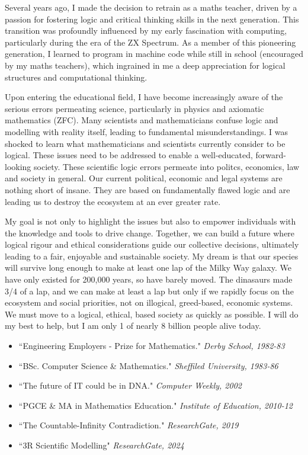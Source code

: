 \documentclass[12pt]{article}
\begin{document}
Several years ago, I made the decision to retrain as a maths teacher, driven by a passion for fostering logic and critical thinking skills in the next generation. This transition was profoundly influenced by my early fascination with computing, particularly during the era of the ZX Spectrum. As a member of this pioneering generation, I learned to program in machine code while still in school (encouraged by my maths teachers), which ingrained in me a deep appreciation for logical structures and computational thinking.

Upon entering the educational field, I have become increasingly aware of the serious errors permeating science, particularly in physics and axiomatic mathematics (ZFC). Many scientists and mathematicians confuse logic and modelling with reality itself, leading to fundamental misunderstandings. I was shocked to learn what mathematicians and scientists currently consider to be logical. These issues need to be addressed to enable a well-educated, forward-looking society. These scientific logic errors permeate into politcs, economics, law and society in general. Our current political, economic and legal systems are nothing short of insane. They are based on fundamentally flawed logic and are leading us to destroy the ecosystem at an ever greater rate.

My goal is not only to highlight the issues but also to empower individuals with the knowledge and tools to drive change. Together, we can build a future where logical rigour and ethical considerations guide our collective decisions, ultimately leading to a fair, enjoyable and sustainable society. My dream is that our species will survive long enough to make at least one lap of the Milky Way galaxy. We have only existed for 200,000 years, so have barely moved. The dinasaurs made 3/4 of a lap, and we can make at least a lap but only if we rapidly focus on the ecosystem and social priorities, not on illogical, greed-based, economic systems. We must move to a logical, ethical, \iR{} based society as quickly as possible. I will do my best to help, but I am only 1 of nearly 8 billion people alive today.
\begin{itemize}
    \item ``Engineering Employers - Prize for Mathematics." \textit{Derby School, 1982-83}
    \item ``BSc. Computer Science \& Mathematics." \textit{Sheffiled University, 1983-86}
    \item ``The future of IT could be in DNA." \textit{Computer Weekly, 2002}
    \item ``PGCE \& MA in Mathematics Education." \textit{Institute of Education, 2010-12}
    \item ``The Countable-Infinity Contradiction." \textit{ResearchGate, 2019}
    \item ``3R Scientific Modelling" \textit{ResearchGate, 2024}
\end{itemize}
\end{document}
